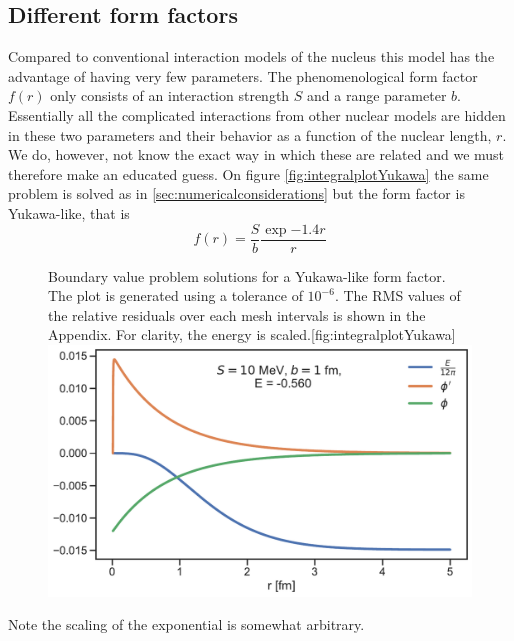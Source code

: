 \subsection{Different form factors}
Compared to conventional interaction models of the nucleus this model has the advantage of having very few parameters. The phenomenological form factor $f(r)$ only consists of an interaction strength $S$ and a range parameter $b$. Essentially all the complicated interactions from other nuclear models are hidden in these two parameters and their behavior as a function of the nuclear length, $r$. We do, however, not know the exact way in which these are related and we must therefore make an educated guess. 
On figure \ref{fig:integralplotYukawa} the same problem is solved as in \ref{sec:numericalconsiderations} but the form factor is Yukawa-like, that is
\begin{equation}
    f(r) = \frac{S}{b}\frac{\exp{-1.4r}}{r}
\end{equation}
\begin{figure}[H]
    \begin{sidecaption}{Boundary value problem solutions for a Yukawa-like form factor. The plot is generated using a tolerance of $10^{-6}$. The RMS values of the relative residuals over each mesh intervals is shown in the Appendix. For clarity, the energy is scaled.}[fig:integralplotYukawa]
    \includegraphics[width=\linewidth]{Figures/yukawa.pdf}
    \end{sidecaption}
\end{figure}
Note the scaling of the exponential is somewhat arbitrary.




